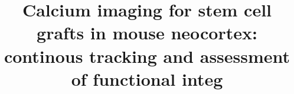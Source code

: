 \title{Calcium imaging for stem cell grafts in mouse neocortex: continous tracking and assessment of functional integ}